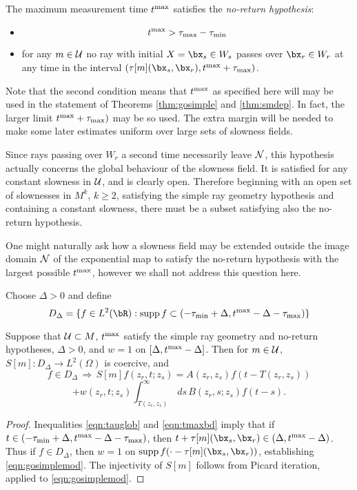 The maximum measurement time $t^{\rm max}$ satisfies the {\em
  no-return hypothesis}:
\begin{itemize}
\item
\begin{equation}
\label{eqn:tmaxbd}
t^{\rm max} >  \tau_{\rm max}-\tau_{\rm min}
\end{equation}
\item for any $m \in {\cal U}$ no ray with initial $X=\bx_s \in W_s$ passes over $\bx_r \in W_r$
at any time in the interval $(\tau[m](\bx_s,\bx_r), t^{\rm max}+\tau_{\rm max})$.
\end{itemize}
Note that the second condition means that $t^{\rm max}$ as specified 
here will may be used in the statement of Theorems \ref{thm:gosimple}
and \ref{thm:smdep}. In fact, the larger limit $t^{\rm max} +\tau_{\rm max})$ may be so used. The extra margin will be needed to
make some later estimates uniform over large sets of
slowness fields.

Since rays passing over $W_r$ a second time necessarily leave ${\cal
  N}$, this hypothesis actually concerns the global behaviour of the
slowness field. It is satisfied for any constant slowness in ${\cal
  U}$, and is clearly open. Therefore beginning with an open set of
slownesses in $M^k$, $k \ge 2$, satisfying the simple ray geometry
hypothesis and containing a constant slowness, there must be a subset
satisfying also the no-return hypothesis.

One might naturally ask how a slowness field may be
extended outside the image domain ${\cal N}$ of the exponential map to
satisfy the no-return hypothesis with the largest possible $t^{\rm
  max}$, however we shall not address this question here. 

Choose $\Delta > 0$ and define
\begin{equation}
\label{eqn:fwddomdef}
D_{\Delta} = \{f \in L^2(\bR): {\rm supp}\,f \subset (-\tau_{\rm min} +
\Delta, t^{\rm max} -\Delta - \tau_{\rm max})\}
\end{equation}

\begin{theorem}
\label{thm:fwdinj}
Suppose that ${\cal U} \subset M$, $t^{\rm max}$ satisfy the simple 
ray geometry and no-return hypotheses, $\Delta >0$, and $w=1$ on 
$[\Delta, t^{\rm max}-\Delta]$. Then for $m \in {\cal U}$,
$S[m]:D_{\Delta} \rightarrow L^2(\Omega)$ is coercive, and 
\[
f \in D_{\Delta} \,\Rightarrow \, S[m]f (z_r,t;z_s) =
A(z_r,z_s)f(t-T(z_r,z_s)) 
\]
\begin{equation}
\label{eqn:gosimplemod} 
+ w(z_r,t;z_s)\int_{T(z_r,z_s)}^{\infty}
\,ds\,B(z_r,s;z_s)f(t-s). 
\end{equation}
\end{theorem}
\begin{proof}
Inequalities \ref{eqn:tauglob} and \ref{eqn:tmaxbd} imply that if
$t \in (-\tau_{\rm min} +
\Delta, t^{\rm max} -\Delta - \tau_{\rm max})$,  then $t+\tau[m](\bx_s,\bx_r) \in (\Delta ,t^{\rm
  max}-\Delta)$. Thus if $f \in D_{\Delta}$, then $w=1$ on ${\rm
  supp}\,f(\cdot-\tau[m](\bx_s,\bx_r))$, establishing
\ref{eqn:gosimplemod}. The injectivity of $S[m]$ follows from Picard
iteration, applied to \ref{eqn:gosimplemod}.
\end{proof}


